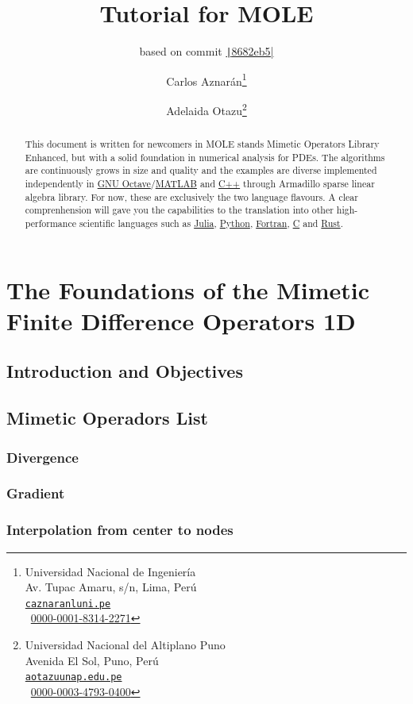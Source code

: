 \documentclass[a4paper,abstract=true]{scrreprt}
\title{\color{DarkBlue}Tutorial for MOLE}
\subtitle{\color{DarkBlue}based on commit \href{https://github.com/csrc-sdsu/mole/tree/8682eb591409088e0647250c8b027d181abb755c}{\texttt|8682eb5|}}
\author{
	Carlos Aznarán\thanks{
		Universidad Nacional de Ingeniería \\
		Av. Tupac Amaru, s/n, Lima, Perú \\
		\href{mailto:caznaranl@uni.pe}{\texttt{caznaranl\MVAt uni.pe}} \\
		\textcolor{orcidcolor}{\aiOrcid}~\href{https://orcid.org/0000-0001-8314-2271}{0000-0001-8314-2271}}
	\and Adelaida Otazu\thanks{
		Universidad Nacional del Altiplano Puno \\
		Avenida El Sol, Puno, Perú \\
		\href{mailto:aotazu@unap.edu.pe}{\texttt{aotazu\MVAt unap.edu.pe}} \\
		\textcolor{orcidcolor}{\aiOrcid}~\href{https://orcid.org/0000-0003-4793-0400}{0000-0003-4793-0400}}
}
\begin{document}
\maketitle

\begin{abstract}
	This document is written for newcomers in MOLE stands
	Mimetic Operators Library Enhanced, but with a solid foundation
	in numerical analysis for PDEs.
	The algorithms are continuously grows in size and quality and the
	examples are diverse implemented independently in
	\href{https://octave.org}{GNU Octave}/\href{https://www.mathworks.com/products/matlab.html}{MATLAB}
	and \href{https://isocpp.org}{C++} through Armadillo sparse
	linear algebra library.
	For now, these are exclusively the two language flavours.
	A clear comprenhension will gave you the capabilities to the translation
	into other high-performance scientific languages such as \href{https://julialang.org}{Julia},
	\href{https://www.python.org}{Python}, \href{https://fortran-lang.org}{Fortran}, \href{https://www.open-std.org/jtc1/sc22/wg14}{C}
	and \href{https://www.rust-lang.org}{Rust}.
\end{abstract}

\tableofcontents

\part{The Foundations of the Mimetic Finite Difference Operators 1D}

\chapter{Introduction and Objectives}

\chapter{Mimetic Operadors List}

\section{Divergence}

\section{Gradient}

\section{Interpolation from center to nodes}
\end{document}
